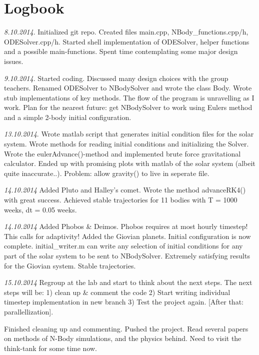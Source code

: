 \documentclass[11pt, oneside]{article}   	%
\begin{document}


\newpage
\section{Logbook}

\emph{8.10.2014}. 
Initialized git repo. Created files main.cpp, NBody\_functions.cpp/h, ODESolver.cpp/h. Started shell implementation of ODESolver, helper functions and a possible main-functions. Spent time contemplating some major design issues.

\emph{9.10.2014}.
Started coding. Discussed many design choices with the group teachers. Renamed ODESolver to NBodySolver and wrote the class Body. Wrote stub implementations of key methods. The flow of the program is unravelling as I work. Plan for the nearest future: get NBodySolver to work using Eulers method and a simple 2-body initial configuration.  

\emph{13.10.2014}.
Wrote matlab script that generates initial condition files for the solar system. Wrote methods for reading initial conditions and initializing the Solver. Wrote the eulerAdvance()-method and implemented brute force gravitational calculator. Ended up with promising plots with matlab of the solar system (albeit quite inaccurate..). Problem: allow gravity() to live in seperate file. 

\emph{14.10.2014}
Added Pluto and Halley's comet. Wrote the method advanceRK4() with great success. Achieved stable trajectories for 11 bodies with T = 1000 weeks, dt = 0.05 weeks. 

\emph{14.10.2014}
Added Phobos \& Deimos. Phobos requires at most hourly timestep! This calls for adaptivity! Added the Giovian planets. Initial configuration is now complete. initial\_writer.m can write any selection of initial conditions for any part of the solar system to be sent to NBodySolver. Extremely satisfying results for the Giovian system. Stable trajectories. 

\emph{15.10.2014}
Regroup at the lab and start to think about the next steps. The next steps will be: 1) clean up \& comment the code 2) Start writing individual timestep implementation in new branch 3) Test the project again. [After that: parallellization]. 

Finished cleaning up and commenting. Pushed the project. Read several papers on methods of N-Body simulations, and the physics behind. Need to visit the think-tank for some time now. 
\end{document}
